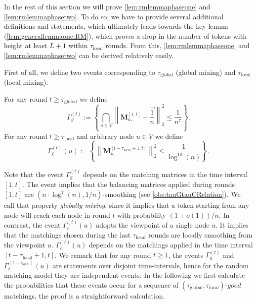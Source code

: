 \documentclass[twoside,leqno]{article}
\newcommand{\M}{\mathbf{M}}
\DeclareMathOperator{\1}{\mathbf{1}}
\newcommand{\taulocal}{\tau_{\mathrm{local}}}
\newcommand{\tauglobal}{\tau_{\mathrm{global}}}
\numberwithin{equation}{section}
\begin{document}
In the rest of this section we will prove \cref{lem:rmlemmaphaseone} and \cref{lem:rmlemmaphasetwo}. To do so, we have to provide several additional definitions and statements, which ultimately leads towards the key lemma (\cref{lem:generallemmaone:RM}), which proves a drop in the number of tokens with height at least $L+1$ within $\taulocal$ rounds. From this,  \cref{lem:rmlemmaphaseone} and \cref{lem:rmlemmaphasetwo} can be derived relatively easily.

First of all, we define two events corresponding to $\tauglobal$ (global mixing) and $\taulocal$ (local mixing).
\begin{definition}\label{taus}
For any round $t\ge \tauglobal$ we define
\[
\Gamma_g^{(t)}:= \left\{
\bigcap_{u \in V} \left\| \M_{u,.}^{[1,t]} - \vec{ \frac{1}{n}} \right\|_2^2 \leq \frac{1}{n^7} \right\}.
\]
\noindent For any round $t\ge \taulocal$ and arbitrary node $u\in V$ we define
\[
\Gamma_{\ell}^{(t)}(u):= \left\{ \left\| 
\M_{u,.}^{[t-\taulocal+1,t]}\right\|_{2}^{2} \le \frac{1}{\log^{10}(n)} \right\}.
\]
\end{definition}

Note that the event $\Gamma_g^{(t)} $ depends on the matching matrices in the time interval $[1,t]$. The event implies that the balancing matrices applied during rounds $[1,t]$ are $(n\cdot \log^{7}(n),1/n)$-smoothing
(see \cref{obs:tauGtauCRelation}).
We call that property \emph{globally mixing}, since it implies that a token starting from any node will reach each node in round $t$ with probability $(1\pm o(1))/n$.
In contrast, the event $\Gamma_{\ell}^{(t)}(u)$ adopts the viewpoint of a single node $u$.
It implies that the matchings chosen during the last $\taulocal$ rounds are locally smoothing from the viewpoint $u$. $\Gamma_{\ell}^{(t)}(u)$  depends on the matchings applied in the time interval $[t-\taulocal+1,t]$. 
We remark that for any round $t \geq 1$, the events $\Gamma_{g}^{(t)}$ and $\Gamma_{\ell}^{(t+\taulocal)}(u)$ are statements over disjoint time-intervals, hence for the random matching model they are independent events.
In the following we first calculate the probabilities that these events occur for a sequence of $(\tauglobal,\taulocal)$-$good$ matchings, the proof is a straightforward calculation.
\end{document}
